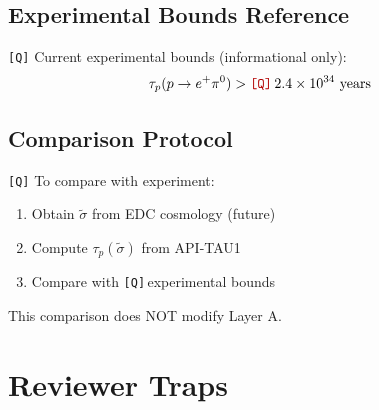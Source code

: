 \documentclass[11pt,a4paper]{article}
\newcommand{\Qnum}[1]{\textcolor{red!70!black}{\texttt{[Q]}}\,#1}
\newcommand{\tagQ}{\textcolor{red!70!black}{\texttt{[Q]}}}
\theoremstyle{definition}
\begin{document}
\subsection{Experimental Bounds Reference}
\label{subsec:exp-bounds}

\tagQ{} Current experimental bounds (informational only):
\begin{equation}
\label{eq:exp-bound-q}
\tau_p(p \to e^+ \pi^0) > \Qnum{2.4 \times 10^{34}~\text{years}}
\end{equation}

\subsection{Comparison Protocol}
\label{subsec:comparison}

\tagQ{} To compare with experiment:
\begin{enumerate}
  \item Obtain $\tilde{\sigma}$ from EDC cosmology (future)
  \item Compute $\tau_p(\tilde{\sigma})$ from API-TAU1
  \item Compare with \Qnum{experimental bounds}
\end{enumerate}

This comparison does NOT modify Layer A.


\newpage
\section{Reviewer Traps}
\label{sec:traps}
\end{document}
